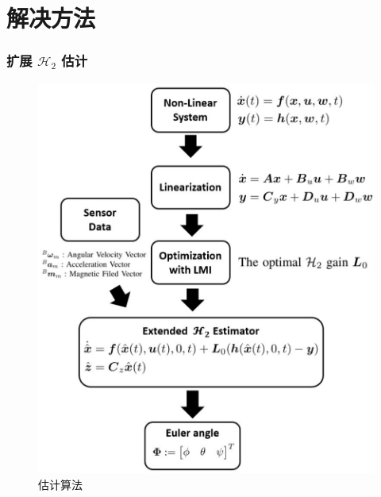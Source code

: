 \documentclass{beamer}
\begin{document}
	\section{解决方法}
	\begin{frame}
		\frametitle{扩展 $\mathcal{H}_2$ 估计}
		\begin{figure}[h!]
			\centering
			\includegraphics[trim={1cm 1cm 1cm 0.4cm},scale=0.41]{flow2.pdf}
			\caption{估计算法}
			\label{algorithm}
		\end{figure}
	\end{frame}
	
\end{document}
